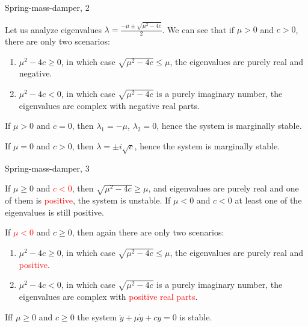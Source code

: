 \documentclass{beamer}
\begin{document}
\begin{frame}{Spring-mass-damper, 2}
	\begin{flushleft}
		
		Let us analyze eigenvalues $\lambda = \frac{-\mu \pm \sqrt{\mu^2 - 4 c} }{2}$. We can see that if \textcolor{mydarkgreen}{$\mu > 0$} and \textcolor{mydarkgreen}{$ c > 0$}, there are only two scenarios: 
		
		\begin{enumerate}
			\item $\mu^2 - 4c \geq 0$, in which case $\sqrt{\mu^2 - 4c} \leq \mu$, the eigenvalues are purely real and \textcolor{mydarkgreen}{negative}.
			\item $\mu^2 - 4c < 0$, in which case $\sqrt{\mu^2 - 4c}$ is a purely imaginary number, the eigenvalues are complex with \textcolor{mydarkgreen}{negative real parts}.
		\end{enumerate}
		
		If $\mu > 0$ and \textcolor{myblue}{$c = 0$}, then $\lambda_1 = -\mu$, $\lambda_2 = 0$, hence the system is \textcolor{myblue}{marginally stable}.
		
		If \textcolor{myblue}{$\mu = 0$} and $c > 0$, then $\lambda = \pm i \sqrt{c}$, hence the system is \textcolor{myblue}{marginally stable}.
		
	\end{flushleft}
\end{frame}



\begin{frame}{Spring-mass-damper, 3}
	\begin{flushleft}
		
		
		If $\mu \geq 0$ and \textcolor{red}{$c < 0$}, then $\sqrt{\mu^2 - 4c} \geq \mu$, and eigenvalues are purely real and one of them is \textcolor{red}{positive}, the system is unstable. If $\mu < 0$ and $c < 0$ at least one of the eigenvalues is still positive.
		
		\bigskip
		
		If \textcolor{red}{$\mu < 0$} and $c \geq 0$, then again there are only two scenarios: 
		
		\begin{enumerate}
			\item $\mu^2 - 4c \geq 0$, in which case $\sqrt{\mu^2 - 4c} \leq \mu$, the eigenvalues are purely real and \textcolor{red}{positive}.
			\item $\mu^2 - 4c < 0$, in which case $\sqrt{\mu^2 - 4c}$ is a purely imaginary number, the eigenvalues are complex with \textcolor{red}{positive real parts}.
		\end{enumerate}
		
		\begin{definition}
			Iff $\mu \geq 0$ and $c \geq 0$ the system $\ddot y + \mu \dot y + c y = 0$ is stable.
		\end{definition}
		
	\end{flushleft}
\end{frame}
\end{document}
